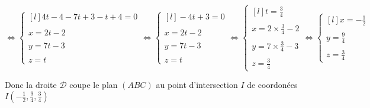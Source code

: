 \documentclass{article}
\begin{document}
\vspace{2mm}

$
\Leftrightarrow
\left\{\begin{matrix*}[l]
   4t - 4 - 7t + 3 - t + 4 = 0 \\
   \\
   x=2t-2\\
   \\
   y=7t-3\\
   \\
   z=t
\end{matrix*}\right.
\Leftrightarrow
\left\{\begin{matrix*}[l]
   -4t + 3 = 0 \\
   \\
   x=2t-2\\
   \\
   y=7t-3\\
   \\
   z=t
\end{matrix*}\right.
\Leftrightarrow
\left\{\begin{matrix*}[l]
   t = \displaystyle\frac{3}{4} \\
   \\
   x=2\times\displaystyle\frac{3}{4} - 2\\
   \\
   y=7\times\displaystyle\frac{3}{4} - 3\\
   \\
   z= \displaystyle\frac{3}{4}
\end{matrix*}\right.
\Leftrightarrow
\left\{\begin{matrix*}[l]
   x=-\displaystyle\frac{1}{2}\\
   \\
   y=\displaystyle\frac{9}{4}\\
   \\
   z=\displaystyle\frac{3}{4}
\end{matrix*}\right.
$

\vspace{2mm}

Donc la droite $\mathscr{D}$ coupe le plan $(ABC)$ au point d'intersection $I$ de coordonées $I(-\frac{1}{2}, \frac{9}{4}, \frac{3}{4})$
\end{document}
